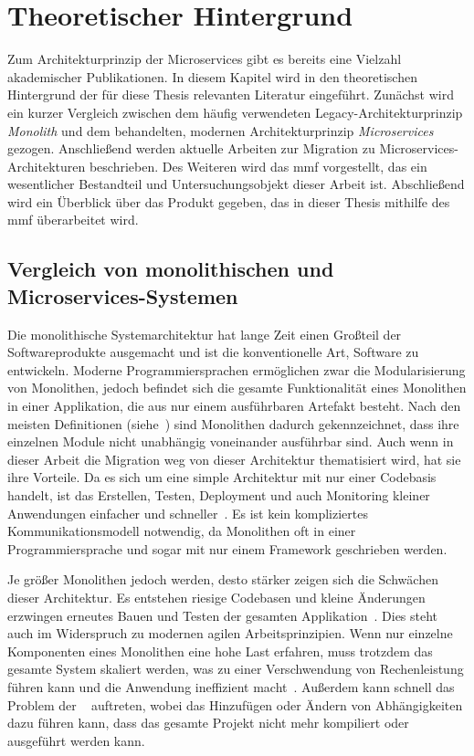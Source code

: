 \chapter{Theoretischer Hintergrund}
\label{chap:theoretischer-hintergrund}
Zum Architekturprinzip der Microservices gibt es bereits eine Vielzahl akademischer Publikationen.
In diesem Kapitel wird in den theoretischen Hintergrund der für diese Thesis relevanten Literatur eingeführt.
Zunächst wird ein kurzer Vergleich zwischen dem häufig verwendeten Legacy-Architekturprinzip \emph{Monolith} und dem behandelten, modernen Architekturprinzip \emph{Microservices} gezogen.
Anschließend werden aktuelle Arbeiten zur Migration zu Microservices-Architekturen beschrieben.
Des Weiteren wird das \acrfull{mmf} vorgestellt, das ein wesentlicher Bestandteil und Untersuchungsobjekt dieser Arbeit ist.
Abschließend wird ein Überblick über das Produkt gegeben, das in dieser Thesis mithilfe des \gls{mmf} überarbeitet wird.

\section{Vergleich von monolithischen und Microservices-Systemen}
\label{sec:monolith-vs-microservices}

Die monolithische Systemarchitektur hat lange Zeit einen Großteil der Softwareprodukte ausgemacht und ist die konventionelle Art, Software zu entwickeln.
Moderne Programmiersprachen ermöglichen zwar die Modularisierung von Monolithen, jedoch befindet sich die gesamte Funktionalität eines Monolithen in einer Applikation, die aus nur einem ausführbaren Artefakt besteht.
Nach den meisten Definitionen (siehe~\cite{Dragoni2017}) sind Monolithen dadurch gekennzeichnet, dass ihre einzelnen Module nicht unabhängig voneinander ausführbar sind.
Auch wenn in dieser Arbeit die Migration weg von dieser Architektur thematisiert wird, hat sie ihre Vorteile.
Da es sich um eine simple Architektur mit nur einer Codebasis handelt, ist das Erstellen, Testen, Deployment und auch Monitoring kleiner Anwendungen einfacher und schneller~\cite{a-survey-on}.
Es ist kein kompliziertes Kommunikationsmodell notwendig, da Monolithen oft in einer Programmiersprache und sogar mit nur einem Framework geschrieben werden.

Je größer Monolithen jedoch werden, desto stärker zeigen sich die Schwächen dieser Architektur.
Es entstehen riesige Codebasen und kleine Änderungen erzwingen erneutes Bauen und Testen der gesamten Applikation~\cite{Dragoni2017}.
Dies steht auch im Widerspruch zu modernen agilen Arbeitsprinzipien.
Wenn nur einzelne Komponenten eines Monolithen eine hohe Last erfahren, muss trotzdem das gesamte System skaliert werden, was zu einer Verschwendung von Rechenleistung führen kann und die Anwendung ineffizient macht~\cite{Dragoni2017}.
Außerdem kann schnell das Problem der ~\cite{Dragoni2017} auftreten, wobei das Hinzufügen oder Ändern von Abhängigkeiten dazu führen kann, dass das gesamte Projekt nicht mehr kompiliert oder ausgeführt werden kann.

